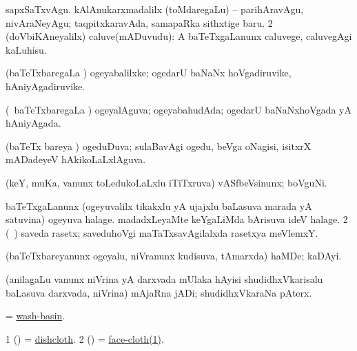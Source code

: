 \noindent 
\gl{\pagu}
\expl{}
\bmng
\bnum
{}  
\banum
{} sapxSaTxvAgu. 
 kAlAnukarxmadalilx (toMdaregaLu) -- parihAravAgu, nivAraNeyAgu; taqpitxkaravAda, samapaRka sithxtige baru. 
\eanum
\numie
\num{2}  (doVbiKAneyalilx) caluve(mADuvudu):  A baTeTxgaLanunx caluvege, caluvegAgi kaLuhisu. 
\enum
\emng
\eentry

\bentry
{} 
\gl{\saMkiSx}
\expl{}
\bmng
{} 
\emng
\eentry

\bentry
{} 
\gl{\nA}
\expl{}
\bmng
(baTeTxbaregaLa \vi) ogeyabalilxke; ogedarU baNaNx hoVgadiruvike, hAniyAgadiruvike. 
\emng
\eentry

\bentry
{} 
\gl{\gu}
\expl{}
\bmng
(\kanmu\ baTeTxbaregaLa \vi) ogeyalAguva; ogeyabahudAda; ogedarU baNaNxhoVgada yA hAniyAgada. 
\emng
\eentry

\bentry
{} 
\gl{\gu}
\expl{}
\bmng
(baTeTx bareya \vi) ogeduDuva; sulaBavAgi ogedu, beVga oNagisi, isitxrX mADadeyeV hAkikoLaLxlAguva. 
\emng
\eentry

\bentry
{} 
\gl{\nA}
\expl{}
\bmng
(keY, muKa, \mo vanunx toLedukoLaLxlu iTiTxruva) vASfbeVsinunx; boVguNi. 
\emng
\eentry

\bentry
{} 
\gl{\nA}
\expl{}
\bmng
\bnum
{} 
\banum
{} baTeTxgaLanunx (ogeyuvalilx tikakxlu yA ujajxlu baLasuva marada yA satuvina) ogeyuva halage. 
 madadxLeyaMte keYgaLiMda bArisuva ideV halage. 
\eanum
\numie
\num{2} (\kanu\ \ame) saveda rasetx; saveduhoVgi maTaTxsavAgilalxda rasetxya meVlemxY. 
\enum
\emng
\eentry

\bentry
{} 
\gl{\nA}
\expl{}
\bmng
(baTeTxbareyanunx ogeyalu, niVranunx kudisuva, tAmarxda) haMDe; kaDAyi. 
\emng
\eentry

\bentry
{} 
\gl{\nA}
\expl{}
\bmng
(anilagaLu \mo vanunx niVrina yA darxvada mUlaka hAyisi shudidhxVkarisalu baLasuva darxvada, niVrina) mAjaRna jADi; shudidhxVkaraNa pAterx. 
\emng
\eentry

\bentry
{} 
\gl{\nA}
\expl{}
\bmng
= \hyperlink{wash-basin}{wash-basin}. 
\emng
\eentry

\bentry
{} 
\gl{\nA}
\expl{}
\bmng
\bnum
\num{1} (\birx) = \hyperref{kandict_d.pdf}{D}{dishcloth}{dishcloth}. 
\num{2} (\ame)  = \hyperref{kandict_f.pdf}{F}{face-cloth(1)}{face-cloth(1)}. 
\enum
\emng
\eentry

